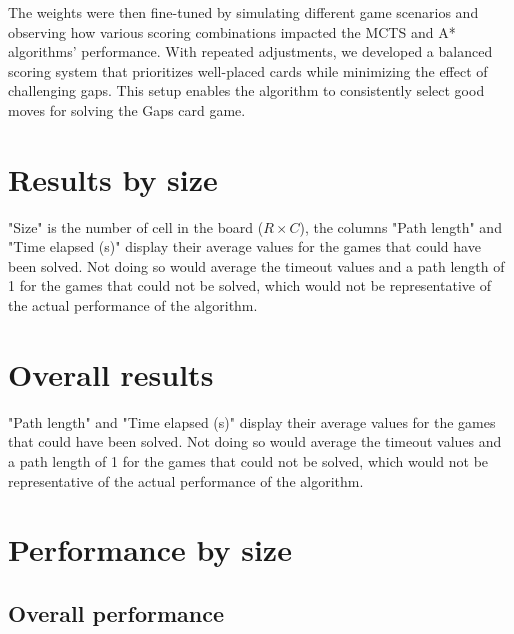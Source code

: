 The weights were then fine-tuned by simulating different game scenarios and observing how various scoring combinations impacted the MCTS and A* algorithms' performance. With repeated adjustments, we developed a balanced scoring system that prioritizes well-placed cards while minimizing the effect of challenging gaps. This setup enables the algorithm to consistently select good moves for solving the Gaps card game.

\section{Results by size}
\begin{table}[H]
\centering

\caption{"Size" is the number of cell in the board ($R \times C$), the columns "Path length" and "Time elapsed (s)" display their average values for the games that could have been solved. Not doing so would average the timeout values and a path length of 1 for the games that could not be solved, which would not be representative of the actual performance of the algorithm.}
\end{table}

\section{Overall results}
\begin{table}[H]
  \centering
  
  \caption{"Path length" and "Time elapsed (s)" display their average values for the games that could have been solved. Not doing so would average the timeout values and a path length of 1 for the games that could not be solved, which would not be representative of the actual performance of the algorithm.}
\end{table}

\newpage
\section{Performance by size}

\newpage
\subsection{Overall performance}
